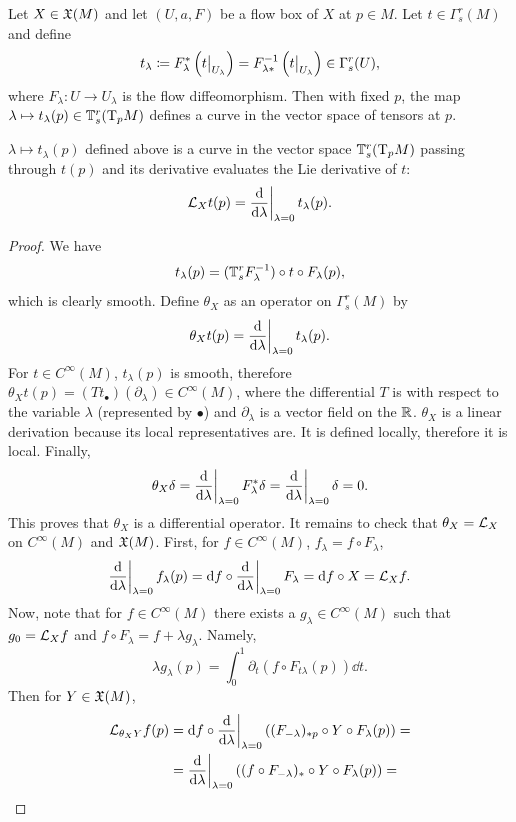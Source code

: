 Let $X\in \mathfrak{X}(M)$ and let $(U,a,F)$ be a flow box of $X$ at $p\in M$. Let $t\in\Gamma^r_s(M)$ and define
\[t_\lambda\coloneqq F_{\lambda}^\ast \left(\restr{t}{U_\lambda}\right)=F_{\lambda\ast}^{-1} \left(\restr{t}{U_\lambda}\right)\in\Gamma^r_s(U),\]
where $F_\lambda :U\to U_\lambda$ is the flow diffeomorphism. Then with fixed $p$, the map $\lambda\mapsto t_\lambda (p) \in \mathbb{T}^r_s (\mathrm{T}_p M)$ defines a curve in the vector space of tensors at $p$.
\begin{thm}
    $\lambda\mapsto t_\lambda (p)$ defined above is a curve in the vector space $\mathbb{T}^r_s (\mathrm{T}_p M)$ passing through $t(p)$ and its derivative evaluates the Lie derivative of $t$:
    \[\Lie_X t(p)=\restr{\frac{\dd}{\dd \lambda}}{\lambda=0}t_\lambda(p).\]
\end{thm}
\begin{proof}
    We have 
    \[t_\lambda(p)=(\mathbb{T}^r_s F_\lambda^{-1})\circ t \circ F_\lambda(p),\] 
    which is clearly smooth.
    Define $\theta_X$ as an operator on $\Gamma^r_s(M)$ by 
    \[\theta_X t(p)=\restr{\frac{\dd}{\dd \lambda}}{\lambda=0} t_\lambda(p).\]
    For $t\in C^\infty(M)$, $t_\lambda(p)$ is smooth, therefore $\theta_X t(p)=(Tt_\bullet)(\partial_\lambda)\in C^\infty(M)$, where the differential $T$ is with respect to the variable $\lambda$ (represented by $\bullet$) and  $\partial_\lambda$ is a vector field on the $\mathbb{R} $. $\theta_X$ is a linear derivation because its local representatives are. It is defined locally, therefore it is local. Finally, 
    \[\theta_X\delta=\restr{\frac{\dd}{\dd \lambda}}{\lambda=0} F^\ast_\lambda \delta=\restr{\frac{\dd}{\dd \lambda}}{\lambda=0}\delta=0.\] 
    This proves that $\theta_X$ is a differential operator. It remains to check that $\theta_X=\mathcal{L}_X$ on $C^\infty(M)$ and $\mathfrak{X}(M)$. First, for $f\in C^\infty(M)$, 
    $f_\lambda=f\circ F_\lambda$, 
    \[\restr{\frac{\dd}{\dd \lambda}}{\lambda=0}f_\lambda(p)=\dd f\circ \restr{\frac{\dd}{\dd \lambda}}{\lambda=0}F_\lambda=\dd f\circ X=\Lie_X f.\]
    Now, note that for $f\in C^\infty(M)$ there exists a $g_\lambda\in C^\infty(M)$ such that $g_0=\mathcal{L}_X f$ and $f\circ F_\lambda=f+\lambda g_\lambda$. Namely, 
    \[\lambda g_\lambda (p)=\int_0^1 \partial_t(f\circ F_{t\lambda}(p))\dd t.\] 
    Then for $Y\in\mathfrak{X}(M)$,
    \begin{align}
        \Lie_{\theta_X Y}f(p)&=\dd f\circ \restr{\frac{\dd}{\dd \lambda}}{\lambda=0} \left((F_{-\lambda})_{\ast p}\circ Y\circ F_\lambda(p)\right)=\\
        &=\restr{\frac{\dd}{\dd \lambda}}{\lambda=0}\left((f\circ F_{-\lambda})_\ast\circ Y\circ F_\lambda(p)\right)=\\

\end{align}
\end{proof}
